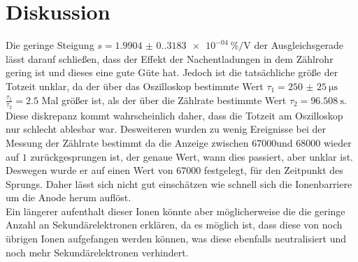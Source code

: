 \section{Diskussion}

Die geringe Steigung $s=\qty{1.9904(0.3183)e-04}{\percent\per\volt}$ der Ausgleichsgerade lässt darauf schließen, dass 
der Effekt der Nachentladungen in dem  Zählrohr gering ist und dieses eine gute Güte hat. Jedoch ist die tatsächliche 
größe der Totzeit unklar, da der über das Oszilloskop bestimmte Wert $\tau_1=\qty{250(25)}{\micro\second}$ 
$\frac{\tau_1}{\tau_2}=2.5$ Mal größer  ist, als der über die Zählrate bestimmte Wert $\tau_2=\qty{96.508}{\second}$.
Diese diskrepanz kommt wahrscheinlich daher, dass die Totzeit am Oszilloskop nur schlecht ablesbar war.
Desweiteren wurden zu wenig Ereignisse bei der Messung der Zählrate bestimmt da die Anzeige zwischen $67000 \text{und }
68000$ wieder auf $1$ zurückgesprungen ist, der genaue Wert, wann dies passiert, aber unklar ist. Deswegen wurde er auf
einen Wert von $67000$ festgelegt, für den Zeitpunkt des Sprungs.
Daher lässt sich nicht gut einschätzen wie schnell sich die Ionenbarriere um die Anode herum auflöst. \\

\noindent Ein längerer aufenthalt dieser Ionen könnte aber möglicherweise die die geringe Anzahl an Sekundärelektronen 
erklären, da es möglich ist, dass diese von noch übrigen Ionen aufgefangen werden können, was diese ebenfalls 
neutralisiert und noch mehr Sekundärelektronen verhindert.

\label{sec:Diskussion}
